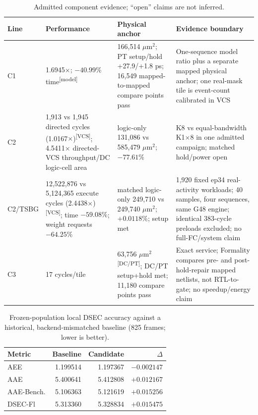 \documentclass[conference]{IEEEtran}
\newcommand{\modeltag}{\textsuperscript{[model]}}
\newcommand{\vcstag}{\textsuperscript{[VCS]}}
\newcommand{\dctag}{\textsuperscript{[DC/PT]}}
\begin{document}
\begin{table}[t]
\caption{Admitted component evidence; ``open'' claims are not inferred.}
\label{tab:main}
\centering
\scriptsize
\begin{tabular}{@{}L{0.055\textwidth}L{0.235\textwidth}L{0.275\textwidth}L{0.365\textwidth}@{}}
\toprule
Line & Performance & Physical anchor & Evidence boundary \\
\midrule
C1 & 1.6945$\times$; $-40.99\%$ time\modeltag & 166,514 $\mu$m$^2$; PT setup/hold +27.9/+1.8 ps; 16,549 mapped-to-mapped compare points pass & One-sequence model ratio plus a separate mapped physical anchor; one real-mask tile is event-count calibrated in VCS \\
C2 & 1,913 vs 1,945 directed cycles (1.0167$\times$)\vcstag; 4.5411$\times$ directed-VCS throughput/DC logic-cell area & logic-only 131,086 vs 585,479 $\mu$m$^2$; $-77.61\%$ & K8 vs equal-bandwidth K1$\times$8 in one admitted campaign; matched hold/power open \\
C2/TSBG & 12,522,876 vs 5,124,365 execute cycles (2.4438$\times$)\vcstag; time $-59.08\%$; weight requests $-64.25\%$ & matched logic-only 249,710 vs 249,740 $\mu$m$^2$; $+0.0118\%$; setup met & 1,920 fixed ep34 real-activity workloads; 40 samples, four sequences, same G48 engine; identical 383-cycle preloads excluded; no full-FC/system claim \\
C3 & 17 cycles/tile & 63,756 $\mu$m$^2$\dctag; DC/PT setup+hold met; 11,180 compare points pass & Exact service; Formality compares pre- and post-hold-repair mapped netlists, not RTL-to-gate; no speedup/energy claim \\
\bottomrule
\end{tabular}
\end{table}

\begin{table}[t]
\caption{Frozen-population local DSEC accuracy against a historical,
backend-mismatched baseline (825 frames; lower is better).}
\label{tab:accuracy}
\centering
\scriptsize
\begin{tabular}{@{}lrrr@{}}
\toprule
Metric & Baseline & Candidate & $\Delta$ \\
\midrule
AEE & 1.199514 & 1.197367 & $-0.002147$ \\
AAE & 5.400641 & 5.412808 & $+0.012167$ \\
AAE-Bench. & 5.106363 & 5.121619 & $+0.015256$ \\
DSEC-Fl & 5.313360 & 5.328834 & $+0.015475$ \\
\bottomrule
\end{tabular}
\end{table}
\end{document}
